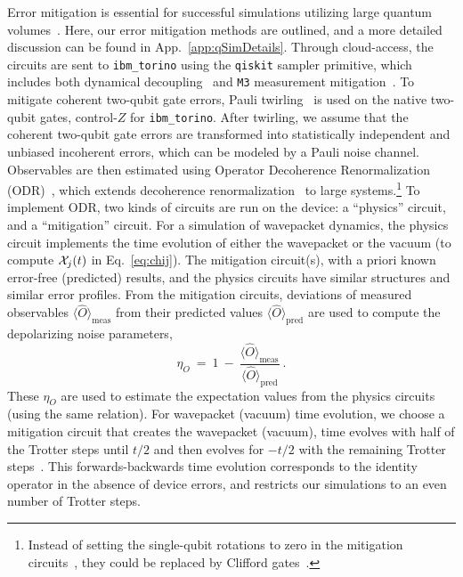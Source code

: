 \documentclass[aps, prc, tightenlines,superscriptaddress, letterpaper, amsmath, amssymb, preprintnumbers, floatfix, longbibliography, nofootinbib]{revtex4-2}
\begin{document}
Error mitigation is essential for successful simulations utilizing large quantum volumes~\cite{Kim:2023bwr}.
Here, our error mitigation methods are outlined, and a more detailed discussion can be found in App.~\ref{app:qSimDetails}. 
Through cloud-access, the circuits are sent to {\tt ibm\_torino} using the {\tt qiskit} sampler primitive, which includes both dynamical decoupling~\cite{Viola:1998dsd,2012RSPTA.370.4748S,Ezzell:2022uat} and {\tt M3} measurement mitigation~\cite{Nation:2021kye}.
To mitigate coherent two-qubit gate errors, Pauli twirling~\cite{Wallman:2016nts} is used on the native two-qubit gates, control-$Z$ for {\tt ibm\_torino}.
After twirling, we assume that the coherent two-qubit gate errors are transformed into statistically independent and unbiased incoherent errors, which can be modeled by a Pauli noise channel. 
Observables are then estimated using Operator Decoherence Renormalization (ODR)~\cite{Farrell:2023fgd}, which extends decoherence renormalization~\cite{Urbanek_2021,ARahman:2022tkr,Farrell:2022wyt,Ciavarella:2023mfc} to large systems.\footnote{Instead of setting the single-qubit rotations to zero in the mitigation circuits~\cite{Farrell:2022wyt,Ciavarella:2023mfc,Farrell:2023fgd}, 
they could be replaced by Clifford gates~\cite{Qin:2021jpm,Robbiati:2023eyl}.
}
To implement ODR, two kinds of circuits are run on the device: a ``physics'' circuit, and a ``mitigation'' circuit.
For a simulation of wavepacket dynamics, the physics circuit implements the time evolution of either the wavepacket or the vacuum (to compute ${\cal X}_j(t)$ in Eq.~\eqref{eq:chij}).
The mitigation circuit(s), with a priori known error-free (predicted) results, 
and the physics circuits have similar structures and similar error profiles.
From the mitigation circuits, deviations of measured observables ${\langle \hat{O} \rangle_{\text{meas}}}$ from their predicted values ${\langle \hat{O} \rangle_{\text{pred}}}$ are used to compute the depolarizing noise parameters,
%
\begin{equation}
\eta_{O} \ = \ 1 \ - \ \frac{\langle \hat{O} \rangle_{\text{meas}}}{\langle \hat{O} \rangle_{\text{pred}}}
\ .
\end{equation}
%
These $\eta_{O}$ are used to estimate the expectation values from the physics circuits (using the same relation).
For wavepacket (vacuum) time evolution, we choose a mitigation circuit that creates the wavepacket (vacuum), time evolves with half of the Trotter steps until $t/2$ and then evolves for $-t/2$ with the remaining Trotter steps~\cite{ARahman:2022tkr}.
This forwards-backwards time evolution corresponds to the identity operator in the absence of device errors, and restricts our simulations to an even number of Trotter steps.
\end{document}
